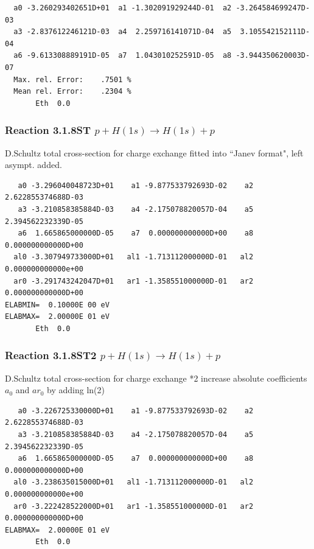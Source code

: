 \documentclass[12pt,dvipdfmx]{article}
\begin{document}
\begin{small}\begin{verbatim}
  a0 -3.260293402651D+01  a1 -1.302091929244D-01  a2 -3.264584699247D-03
  a3 -2.837612246121D-03  a4  2.259716141071D-04  a5  3.105542152111D-04
  a6 -9.613308889191D-05  a7  1.043010252591D-05  a8 -3.944350620003D-07
  Max. rel. Error:    .7501 %
  Mean rel. Error:    .2304 %
       Eth  0.0
\end{verbatim}\end{small}

\subsubsection{
Reaction 3.1.8ST $  p + H(1s) \rightarrow H(1s) + p  $
}
D.Schultz total cross-section for charge exchange
fitted into ``Janev format", left asympt. added.


\begin{small}\begin{verbatim}
   a0 -3.296040048723D+01    a1 -9.877533792693D-02    a2  2.622855374688D-03
   a3 -3.210858385884D-03    a4 -2.175078820057D-04    a5  2.394562232339D-05
   a6  1.665865000000D-05    a7  0.000000000000D+00    a8  0.000000000000D+00
  al0 -3.307949733000D+01   al1 -1.713112000000D-01   al2  0.000000000000e+00
  ar0 -3.291743242047D+01   ar1 -1.358551000000D-01   ar2  0.000000000000D+00
ELABMIN=  0.10000E 00 eV
ELABMAX=  2.00000E 01 eV
       Eth  0.0
\end{verbatim}\end{small}

\subsubsection{
Reaction 3.1.8ST2 $  p + H(1s) \rightarrow H(1s) + p  $
}
D.Schultz total cross-section for charge exchange *2
increase absolute coefficients $a_0$ and $ar_0$ by adding ln(2)

\begin{small}\begin{verbatim}
   a0 -3.226725330000D+01    a1 -9.877533792693D-02    a2  2.622855374688D-03
   a3 -3.210858385884D-03    a4 -2.175078820057D-04    a5  2.394562232339D-05
   a6  1.665865000000D-05    a7  0.000000000000D+00    a8  0.000000000000D+00
  al0 -3.238635015000D+01   al1 -1.713112000000D-01   al2  0.000000000000e+00
  ar0 -3.222428522000D+01   ar1 -1.358551000000D-01   ar2  0.000000000000D+00
ELABMAX=  2.00000E 01 eV
       Eth  0.0
\end{verbatim}\end{small}
\end{document}
